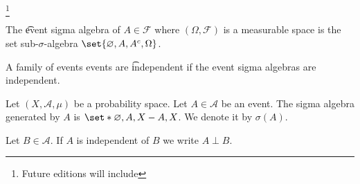 
  \ifhmode\unskip\fi\footnote{
Future editions will include
  }


The \t{event sigma algebra} of $A \in \mathcal{F} $ where $(\Omega , \mathcal{F} )$ is a measurable space is the set sub-$\sigma $-algebra $\set{\varnothing, A, A^c, \Omega }$.

A family of events events are \t{independent} if the event sigma algebras are independent.


Let $(X, \mathcal{A} , \mu )$ be a probability space.
Let $A \in \mathcal{A} $ be an event.
The sigma algebra generated by $A$ is $\set*{\varnothing, A, X - A, X}$.
We denote it by $\sigma (A)$.

Let $B \in \mathcal{A} $.
If $A$ is independent of $B$ we write $A \perp B$.


